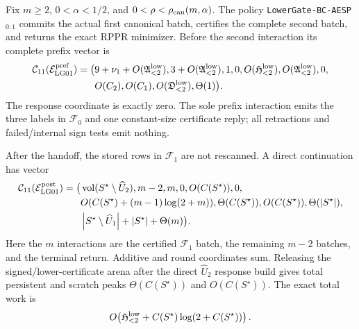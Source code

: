 \begin{theorem}
\label{thm:branch-caterpillar-two-face-lower-handoff}
Fix $m\geq2$, $0<\alpha<1/2$, and
$0<\rho<\rho_{\rm can}(m,\alpha)$.  The policy
\texttt{LowerGate-BC-AESP}$_{0:1}$ commits the actual first canonical batch,
certifies the complete second batch, and returns the exact RPPR minimizer.
Before the second interaction its complete prefix vector is
\begin{equation}
 \begin{aligned}
 \mathcal C_{11}(\mathcal E_{\rm LG01}^{\rm pref})=\bigl(&
 9+\nu_1+O(\mathfrak A_{<2}^{\rm low}),
 3+O(\mathfrak A_{<2}^{\rm low}),1,0,
 O(\mathfrak H_{<2}^{\rm low}),
 O(\mathfrak A_{<2}^{\rm low}),0,\\
 &O(C_2),O(C_1),O(\mathfrak D_{<2}^{\rm low}),\Theta(1)\bigr).
 \end{aligned}
 \label{eq:branch-caterpillar-two-face-lower-prefix-eleven-vector}
\end{equation}
The response coordinate is exactly zero.  The sole prefix interaction emits
the three labels in $\mathcal F_0$ and one constant-size certificate reply;
all retractions and failed/internal sign tests emit nothing.

After the handoff, the stored rows in $\mathcal F_1$ are not rescanned.  A
direct continuation has vector
\begin{equation}
 \begin{aligned}
 \mathcal C_{11}(\mathcal E_{\rm LG01}^{\rm post})=\bigl(&
 \operatorname{vol}(S^\star\setminus\widehat U_2),m-2,m,0,
 O(C(S^\star)),0,\\
 &O(C(S^\star)+(m-1)\log(2+m)),
 \Theta(C(S^\star)),O(C(S^\star)),
 \Theta(\left\lvert S^\star \right\rvert),\\
 &\left\lvert S^\star\setminus\widehat U_1 \right\rvert
  +\left\lvert S^\star \right\rvert+\Theta(m)\bigr).
 \end{aligned}
 \label{eq:branch-caterpillar-two-face-lower-post-eleven-vector}
\end{equation}
Here the $m$ interactions are the certified $\mathcal F_1$ batch, the
remaining $m-2$ batches, and the terminal return.  Additive and round
coordinates sum.  Releasing the signed/lower-certificate arena after the
direct $\widehat U_2$ response build gives total persistent and scratch peaks
$\Theta(C(S^\star))$ and $O(C(S^\star))$.  The exact total work is
\begin{equation}
 O\!\left(\mathfrak H_{<2}^{\rm low}
       +C(S^\star)\log(2+C(S^\star))\right).
 \label{eq:branch-caterpillar-two-face-lower-total-work}
\end{equation}


\end{theorem}
